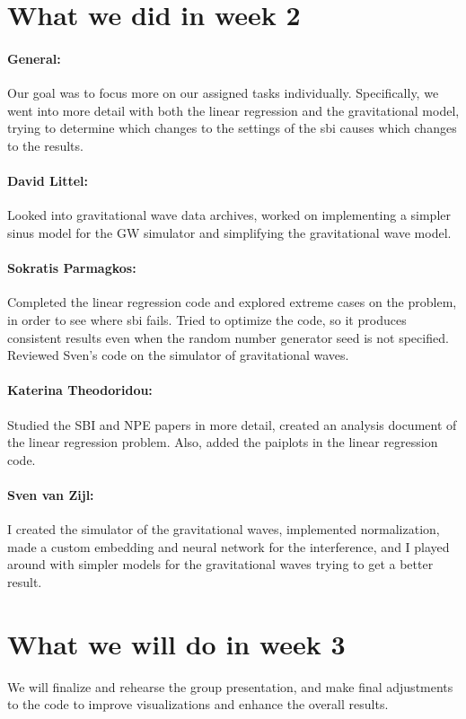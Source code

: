 \documentclass{article}
\begin{document}
\section*{What we did in week 2}

\paragraph{General:}
Our goal was to focus more on our assigned tasks individually. Specifically, we went into more detail with both the linear regression and the gravitational model, trying to determine which changes to the settings of the sbi causes which changes to the results.

\paragraph{David Littel:}
Looked into gravitational wave data archives, worked on implementing a simpler sinus model for the GW simulator and simplifying the gravitational wave model.

\paragraph{Sokratis Parmagkos:}
Completed the linear regression code and explored extreme cases on the problem, in order to see where sbi fails.
Tried to optimize the code, so it produces consistent results even when the random number generator seed is not specified. Reviewed Sven's code on the simulator of gravitational waves.

\paragraph{Katerina Theodoridou:}
Studied the SBI and NPE papers in more detail, created an analysis document of the linear regression problem. Also, added the paiplots in the linear regression code. 

\paragraph{Sven van Zijl:}
I created the simulator of the gravitational waves, implemented normalization, made a custom embedding and neural network for the interference, and I played around with simpler models for the gravitational waves trying to get a better result.


\section*{What we will do in week 3}
We will finalize and rehearse the group presentation, and make final adjustments to the code to improve visualizations and enhance the overall results.
\end{document}
